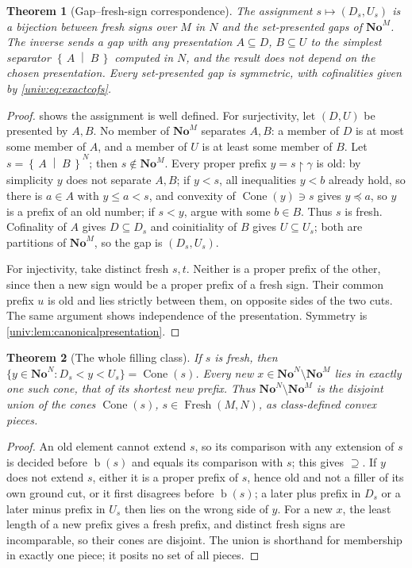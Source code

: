\documentclass[11pt,letterpaper]{article}
\numberwithin{equation}{section}
\newtheorem{theorem}{Theorem}[section]
\theoremstyle{definition}
\theoremstyle{remark}
\newcommand{\No}{\mathbf{No}}
\newcommand{\NoM}{\No^{M}}
\newcommand{\NoN}{\No^{N}}
\newcommand{\bd}{\operatorname{b}}
\newcommand{\Cone}{\operatorname{Cone}}
\newcommand{\Fresh}{\operatorname{Fresh}}
\newcommand{\res}{\mathbin{\upharpoonright}}
\newcommand{\cut}[2]{\left\{\,#1\;\middle|\;#2\,\right\}}
\begin{document}
\begin{theorem}[Gap--fresh-sign correspondence]\label{univ:thm:gapcorrespondence}
The assignment $s\mapsto(D_s,U_s)$ is a bijection between fresh signs over $M$
in $N$ and the set-presented gaps of $\NoM$. The inverse sends a gap with any
presentation $A\subseteq D$, $B\subseteq U$ to the simplest separator
$\cut AB$ computed in $N$, and the result does not depend on the chosen
presentation. Every set-presented gap is symmetric, with cofinalities given by
\eqref{univ:eq:exactcofs}.
\end{theorem}
\begin{proof}
 shows the assignment is well defined.
For surjectivity, let $(D,U)$ be presented by $A,B$. No member of $\NoM$
separates $A,B$: a member of $D$ is at most some member of $A$, and a member of
$U$ is at least some member of $B$. Let $s=\cut AB^N$; then $s\notin\NoM$. Every
proper prefix $y=s\res\gamma$ is old: by simplicity $y$ does not separate
$A,B$; if $y<s$, all inequalities $y<b$ already hold, so there is $a\in A$ with
$y\le a<s$, and convexity of $\Cone(y)\ni s$ gives $y\preceq a$, so $y$ is a
prefix of an old number; if $s<y$, argue with some $b\in B$. Thus $s$ is fresh.
Cofinality of $A$ gives $D\subseteq D_s$ and coinitiality of $B$ gives
$U\subseteq U_s$; both are partitions of $\NoM$, so the gap is $(D_s,U_s)$.

For injectivity, take distinct fresh $s,t$. Neither is a proper prefix of the
other, since then a new sign would be a proper prefix of a fresh sign. Their
common prefix $u$ is old and lies strictly between them, on opposite sides of
the two cuts. The same argument shows independence of the presentation.
Symmetry is \cref{univ:lem:canonicalpresentation}.
\end{proof}

\begin{theorem}[The whole filling class]\label{univ:thm:fillingcone}
If $s$ is fresh, then $\{y\in\NoN:D_s<y<U_s\}=\Cone(s)$. Every new
$x\in\NoN\setminus\NoM$ lies in exactly one such cone, that of its shortest new
prefix. Thus $\NoN\setminus\NoM$ is the disjoint union of the cones
$\Cone(s)$, $s\in\Fresh(M,N)$, as class-defined convex pieces.
\end{theorem}
\begin{proof}
An old element cannot extend $s$, so its comparison with any extension of $s$
is decided before $\bd(s)$ and equals its comparison with $s$; this gives
$\supseteq$. If $y$ does not extend $s$, either it is a proper prefix of $s$,
hence old and not a filler of its own ground cut, or it first disagrees before
$\bd(s)$; a later plus prefix in $D_s$ or a later minus prefix in $U_s$ then
lies on the wrong side of $y$. For a new $x$, the least length of a new prefix
gives a fresh prefix, and distinct fresh signs are incomparable, so their cones
are disjoint. The union is shorthand for membership in exactly one piece; it
posits no set of all pieces.
\end{proof}
\end{document}
